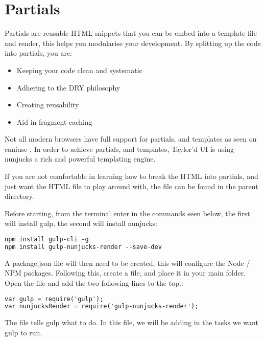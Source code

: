 \newpage
\chapter*{Partials}


Partials are reusable HTML snippets that you can be embed into a template file and render, this helps you modularise your development. By splitting up the code into partials, you are:

\begin{itemize}
	\item Keeping your code clean and systematic
	\item Adhering to the DRY philosophy
	\item Creating reusability
	\item Aid in fragment caching
\end{itemize}

Not all modern browsers have full support for partials, and templates as seen on caniuse \citep{CANI17}. In order to achieve partials, and templates, Taylor'd UI is using nunjucks a rich and powerful templating engine. 

If you are not comfortable in learning how to break the HTML into partials, and just want the HTML file to play around with, the file  can be found in the parent directory.

Before starting, from the terminal enter in the commands seen below, the first will install gulp, the second will install nunjucks:

\begin{lstlisting}[language=HTML]
npm install gulp-cli -g
npm install gulp-nunjucks-render --save-dev
\end{lstlisting}

A package.json file will then need to be created, this will configure the Node / NPM packages. Following this, create a  file, and place it in your main folder. Open the file and add the two following lines to the top.:

\begin{lstlisting}[language=HTML]
var gulp = require('gulp');
var nunjucksRender = require('gulp-nunjucks-render');
\end{lstlisting}

The  file tells gulp what to do. In this file, we will be adding in the tasks we want gulp to run.

